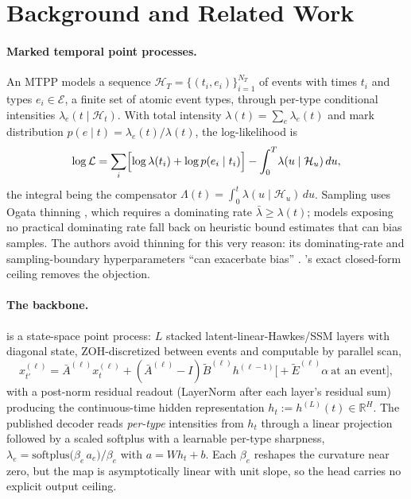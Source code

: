 \section{Background and Related Work}
\label{sec:background}

\paragraph{Marked temporal point processes.}
An MTPP models a sequence $\mathcal{H}_T=\{(t_i,e_i)\}_{i=1}^{N_T}$ of events
with times $t_i$ and types $e_i\in\mathcal{E}$, a finite set of atomic event
types, through per-type conditional intensities $\lambda_e(t\mid\mathcal{H}_t)$. With total intensity $\lambda(t)=\sum_{e}\lambda_e(t)$ and mark
distribution $p(e\mid t)=\lambda_e(t)/\lambda(t)$, the log-likelihood is
\[
\log\mathcal{L}
=\sum_i \Bigl[\log\lambda(t_i)+\log p(e_i\mid t_i)\Bigr]
-\int_0^T\!\lambda(u\mid\mathcal{H}_u)\,du ,
\]
the integral being the compensator
$\Lambda(t)=\int_0^t\lambda(u\mid\mathcal{H}_u)\,du$. Sampling uses Ogata
thinning \citep{lewis1979thinning,ogata1981lewis}, which requires a
dominating rate $\bar\lambda\ge\lambda(t)$; models exposing no practical
dominating rate fall back on heuristic bound estimates that can bias
samples. The \sppp{} authors avoid thinning for this very reason: its
dominating-rate and sampling-boundary hyperparameters ``can exacerbate
bias'' \citep{chang2025ctssm}. \ssppp's exact closed-form ceiling removes
the objection.

\paragraph{The \sppp{} backbone.}
\sppp{} \citep{chang2025ctssm} is a state-space point process: $L$ stacked
latent-linear-Hawkes/SSM layers with diagonal state, ZOH-discretized between
events and computable by parallel scan,
\[
x^{(\ell)}_{t'}=\bar A^{(\ell)} x^{(\ell)}_{t}
+(\bar A^{(\ell)}\!-\!I)\tilde B^{(\ell)} h^{(\ell-1)}
\bigl[+\tilde E^{(\ell)}\alpha\ \text{at an event}\bigr],
\]
with a post-norm residual readout (LayerNorm \citep{ba2016layernorm} after
each layer's residual sum) producing the continuous-time hidden
representation $h_t:=h^{(L)}(t)\in\mathbb{R}^{H}$. The published decoder
reads \emph{per-type} intensities from $h_t$ through a linear projection
followed by a scaled softplus with a learnable per-type sharpness,
$\lambda_e=\mathrm{softplus}\bigl(\beta_e\,a_e\bigr)/\beta_e$ with
$a=Wh_t+b$. Each $\beta_e$ reshapes the curvature near zero, but the map is
asymptotically linear with unit slope, so the head carries no explicit
output ceiling.

